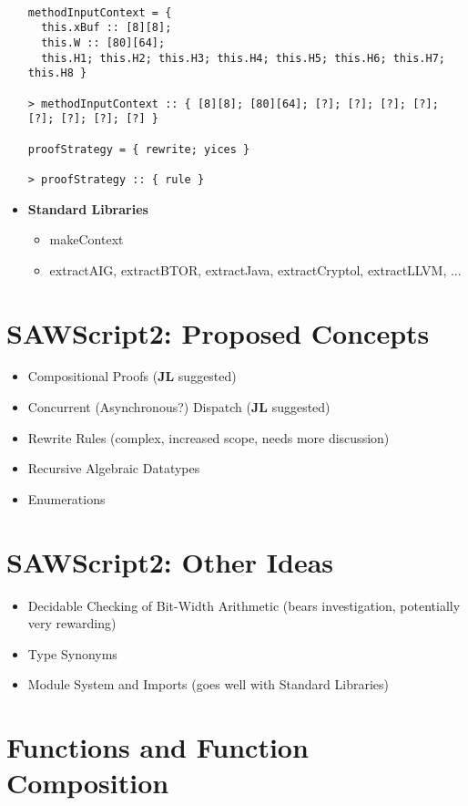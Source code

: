 \documentclass[11pt]{amsart}
\renewcommand{\b}[1]{\textbf{#1}}
\begin{document}
\begin{itemize}
\begin{verbatim}

methodInputContext = {
  this.xBuf :: [8][8];
  this.W :: [80][64];
  this.H1; this.H2; this.H3; this.H4; this.H5; this.H6; this.H7; this.H8 }

> methodInputContext :: { [8][8]; [80][64]; [?]; [?]; [?]; [?]; [?]; [?]; [?]; [?] }

proofStrategy = { rewrite; yices }

> proofStrategy :: { rule }

\end{verbatim}



\item \b{Standard Libraries}
\begin{itemize}
\item makeContext
\item extractAIG, extractBTOR, extractJava, extractCryptol, extractLLVM, ...
\end{itemize}
\end{itemize}

\section*{SAWScript2: Proposed Concepts}

\begin{itemize}
\item Compositional Proofs (\b{JL} suggested)
\item Concurrent (Asynchronous?) Dispatch (\b{JL} suggested)
\item Rewrite Rules (complex, increased scope, needs more discussion)
\item Recursive Algebraic Datatypes
\item Enumerations
\end{itemize}

\section*{SAWScript2: Other Ideas}
\begin{itemize}
\item Decidable Checking of Bit-Width Arithmetic (bears investigation, potentially very rewarding)
\item Type Synonyms
\item Module System and Imports (goes well with Standard Libraries)
\end{itemize}

\section*{Functions and Function Composition}

\section*{}
\end{document}

